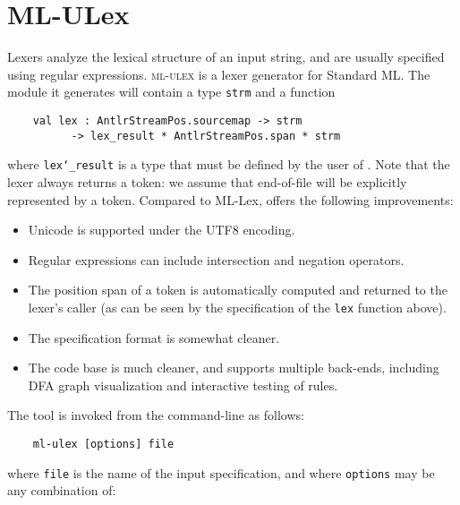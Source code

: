 %
\chapter{ML-ULex}


Lexers analyze the lexical structure of an input string, and are usually specified using regular expressions.  \textsc{ml-ulex} is a lexer generator for Standard ML.  The module it generates will contain a type \texttt{strm} and a function
\begin{verbatim}
    val lex : AntlrStreamPos.sourcemap -> strm
          -> lex_result * AntlrStreamPos.span * strm
\end{verbatim}%
where \texttt{lex\char`\_result} is a type that must be defined by the user of \ulex{}.
Note that the lexer always returns a token: we assume that end-of-file will be explicitly represented by a token.
Compared to ML-Lex, \ulex{} offers the following improvements:
\begin{itemize}
 \item Unicode is supported under the UTF8 encoding.
 \item Regular expressions can include intersection and negation operators.
 \item The position span of a token is automatically computed and returned to the lexer's caller (as can be seen
   by the specification of the \texttt{lex} function above).
 \item The specification format is somewhat cleaner.
 \item The code base is much cleaner, and supports multiple back-ends, including DFA graph visualization and interactive testing of rules.
\end{itemize}%
The tool is invoked from the command-line as follows:
\begin{verbatim}
    ml-ulex [options] file
\end{verbatim}%
where \texttt{file} is the name of the input \ulex{} specification, and where \texttt{options} may be any combination of:

